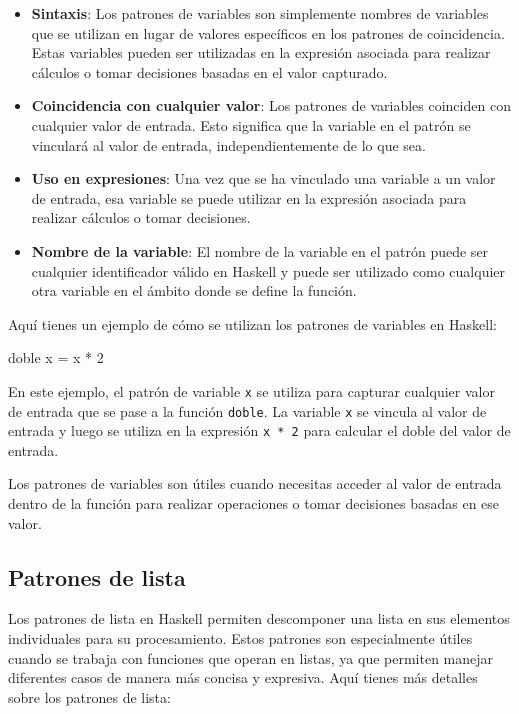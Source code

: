 \documentclass{article}
\begin{document}
\begin{itemize}
    \item \textbf{Sintaxis}: Los patrones de variables son simplemente nombres de variables que se utilizan en lugar de valores específicos en los patrones de coincidencia. Estas variables pueden ser utilizadas en la expresión asociada para realizar cálculos o tomar decisiones basadas en el valor capturado.
    
    \item \textbf{Coincidencia con cualquier valor}: Los patrones de variables coinciden con cualquier valor de entrada. Esto significa que la variable en el patrón se vinculará al valor de entrada, independientemente de lo que sea.
    
    \item \textbf{Uso en expresiones}: Una vez que se ha vinculado una variable a un valor de entrada, esa variable se puede utilizar en la expresión asociada para realizar cálculos o tomar decisiones.
    
    \item \textbf{Nombre de la variable}: El nombre de la variable en el patrón puede ser cualquier identificador válido en Haskell y puede ser utilizado como cualquier otra variable en el ámbito donde se define la función.
\end{itemize}

Aquí tienes un ejemplo de cómo se utilizan los patrones de variables en Haskell:

\begin{haskell}[caption={Ejemplo de patrones de variables en Haskell}]
doble x = x * 2
\end{haskell}

En este ejemplo, el patrón de variable \texttt{x} se utiliza para capturar cualquier valor de entrada que se pase a la función \texttt{doble}. La variable \texttt{x} se vincula al valor de entrada y luego se utiliza en la expresión \texttt{x * 2} para calcular el doble del valor de entrada.

Los patrones de variables son útiles cuando necesitas acceder al valor de entrada dentro de la función para realizar operaciones o tomar decisiones basadas en ese valor.

\subsection{Patrones de lista}

Los patrones de lista en Haskell permiten descomponer una lista en sus elementos individuales para su procesamiento. Estos patrones son especialmente útiles cuando se trabaja con funciones que operan en listas, ya que permiten manejar diferentes casos de manera más concisa y expresiva. Aquí tienes más detalles sobre los patrones de lista:
\end{document}

